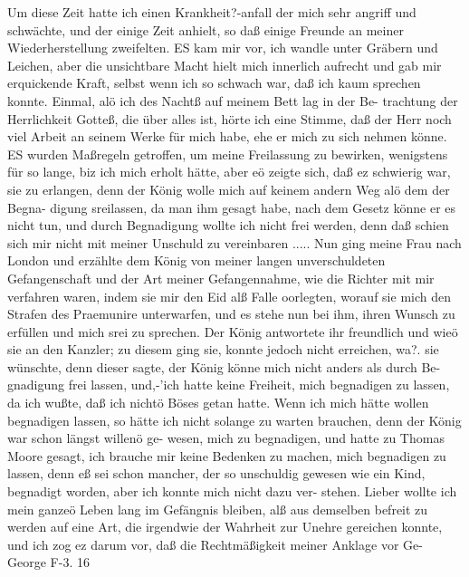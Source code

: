 Um diese Zeit hatte ich einen Krankheit?-anfall der mich sehr
angriff und schwächte, und der einige Zeit anhielt, so daß einige
Freunde an meiner Wiederherstellung zweifelten. ES kam mir
vor, ich wandle unter Gräbern und Leichen, aber die unsichtbare
Macht hielt mich innerlich aufrecht und gab mir erquickende Kraft,
selbst wenn ich so schwach war, daß ich kaum sprechen konnte.
Einmal, alö ich des Nachtß auf meinem Bett lag in der Be-
trachtung der Herrlichkeit Gotteß, die über alles ist, hörte ich
eine Stimme, daß der Herr noch viel Arbeit an seinem Werke für
mich habe, ehe er mich zu sich nehmen könne.
ES wurden Maßregeln getroffen, um meine Freilassung zu
bewirken, wenigstens für so lange, biz ich mich erholt hätte, aber
eö zeigte sich, daß ez schwierig war, sie zu erlangen, denn der
König wolle mich auf keinem andern Weg alö dem der Begna-
digung sreilassen, da man ihm gesagt habe, nach dem Gesetz
könne er es nicht tun, und durch Begnadigung wollte ich nicht
frei werden, denn daß schien sich mir nicht mit meiner Unschuld
zu vereinbaren .....
Nun ging meine Frau nach London und erzählte dem König
von meiner langen unverschuldeten Gefangenschaft und der Art
meiner Gefangennahme, wie die Richter mit mir verfahren waren,
indem sie mir den Eid alß Falle oorlegten, worauf sie mich den
Strafen des Praemunire unterwarfen, und es stehe nun bei ihm,
ihren Wunsch zu erfüllen und mich srei zu sprechen. Der König
antwortete ihr freundlich und wieö sie an den Kanzler; zu diesem
ging sie, konnte jedoch nicht erreichen, wa?. sie wünschte, denn
dieser sagte, der König könne mich nicht anders als durch Be-
gnadigung frei lassen, und,-'ich hatte keine Freiheit, mich begnadigen
zu lassen, da ich wußte, daß ich nichtö Böses getan hatte. Wenn
ich mich hätte wollen begnadigen lassen, so hätte ich nicht solange
zu warten brauchen, denn der König war schon längst willenö ge-
wesen, mich zu begnadigen, und hatte zu Thomas Moore gesagt,
ich brauche mir keine Bedenken zu machen, mich begnadigen zu
lassen, denn eß sei schon mancher, der so unschuldig gewesen wie
ein Kind, begnadigt worden, aber ich konnte mich nicht dazu ver-
stehen. Lieber wollte ich mein ganzeö Leben lang im Gefängnis
bleiben, alß aus demselben befreit zu werden auf eine Art, die
irgendwie der Wahrheit zur Unehre gereichen konnte, und ich zog
ez darum vor, daß die Rechtmäßigkeit meiner Anklage vor Ge-
George F-3. 16


